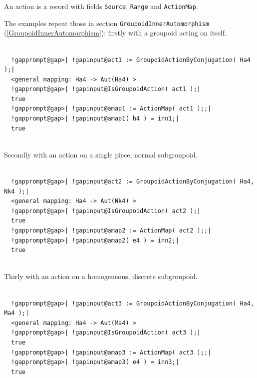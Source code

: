 \documentclass[a4paper,11pt]{report}
\begin{document}
{{{ An action is a record with fields \texttt{Source}, \texttt{Range} and \texttt{ActionMap}. 

 The examples repeat those in section \texttt{GroupoidInnerAutomorphism} (\ref{GroupoidInnerAutomorphism}): firstly with a groupoid acting on itself. 

 }

 
\begin{Verbatim}[commandchars=!@|,fontsize=\small,frame=single,label=Example]
  
  !gapprompt@gap>| !gapinput@act1 := GroupoidActionByConjugation( Ha4 );|
  <general mapping: Ha4 -> Aut(Ha4) >
  !gapprompt@gap>| !gapinput@IsGroupoidAction( act1 );|
  true
  !gapprompt@gap>| !gapinput@amap1 := ActionMap( act1 );;|
  !gapprompt@gap>| !gapinput@amap1( h4 ) = inn1;|
  true
  
\end{Verbatim}
 Secondly with an action on a single piece, normal subgroupoid. 
\begin{Verbatim}[commandchars=!@|,fontsize=\small,frame=single,label=Example]
  
  !gapprompt@gap>| !gapinput@act2 := GroupoidActionByConjugation( Ha4, Nk4 );|
  <general mapping: Ha4 -> Aut(Nk4) >
  !gapprompt@gap>| !gapinput@IsGroupoidAction( act2 );|
  true
  !gapprompt@gap>| !gapinput@amap2 := ActionMap( act2 );;|
  !gapprompt@gap>| !gapinput@amap2( e4 ) = inn2;|
  true
  
\end{Verbatim}
 Thirly with an action on a homogeneous, discrete subgroupoid. 
\begin{Verbatim}[commandchars=!@|,fontsize=\small,frame=single,label=Example]
  
  !gapprompt@gap>| !gapinput@act3 := GroupoidActionByConjugation( Ha4, Ma4 );|
  <general mapping: Ha4 -> Aut(Ma4) >
  !gapprompt@gap>| !gapinput@IsGroupoidAction( act3 );|
  true
  !gapprompt@gap>| !gapinput@amap3 := ActionMap( act3 );;|
  !gapprompt@gap>| !gapinput@amap3( e4 ) = inn3;|
  true
  
\end{Verbatim}
 }

 }

  
\end{document}

